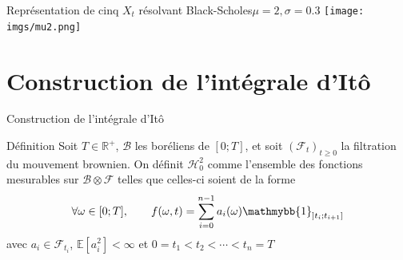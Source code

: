 \documentclass{beamer}
\newcommand{\1}{\mathmybb{1}}
\begin{document}
 \begin{frame}{Représentation de cinq $X_{t}$ résolvant Black-Scholes}{$\mu =2, \sigma =0.3$}
   \texttt{[image: imgs/mu2.png]}
 \end{frame}
 \section{Construction de l'intégrale d'Itô}
 \begin{frame}{Construction de l'intégrale d'Itô}
   \begin{block}{Définition}
     Soit $ T \in \mathbb{R}^{+}$, $\mathcal{B}$ les boréliens de $ \left[0; T  \right]$, et soit $ (\mathcal{F}_{t})_{t \geq 0}$ la filtration du mouvement brownien. On définit $\mathcal{H}^{2}_{0}$ comme l'ensemble des fonctions mesurables sur $\mathcal{B} \otimes \mathcal{F}$ telles que celles-ci soient de la forme 
     \[
       \forall \omega \in [0; T], \qquad f(\omega, t) = \sum_{i=0}^{n-1}a_{i}(\omega) \1_{\left] t_{i} ; t_{i+1} \right] }
     \]
     avec $a_{i} \in \mathcal{F}_{t_{i}}$, $\mathbb{E}\left[ a_{i}^{2} \right] < \infty$ et $0 = t_{1} < t_{2} < \cdots < t_{n} = T$
     \end{block}
    \end{frame}
 
\end{document}

